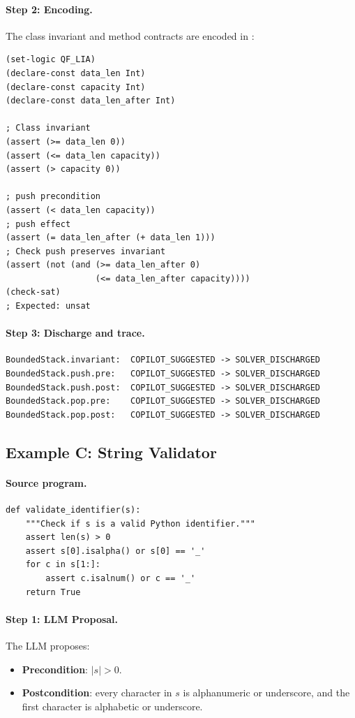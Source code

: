 \documentclass[11pt]{article}
\begin{document}
\paragraph{Step 2: Encoding.}
The class invariant and method contracts are encoded in \QFLIA:
\begin{lstlisting}[style=jugeo-output]
(set-logic QF_LIA)
(declare-const data_len Int)
(declare-const capacity Int)
(declare-const data_len_after Int)

; Class invariant
(assert (>= data_len 0))
(assert (<= data_len capacity))
(assert (> capacity 0))

; push precondition
(assert (< data_len capacity))
; push effect
(assert (= data_len_after (+ data_len 1)))
; Check push preserves invariant
(assert (not (and (>= data_len_after 0)
                  (<= data_len_after capacity))))
(check-sat)
; Expected: unsat
\end{lstlisting}

\paragraph{Step 3: Discharge and trace.}
\begin{lstlisting}[style=jugeo-output]
BoundedStack.invariant:  COPILOT_SUGGESTED -> SOLVER_DISCHARGED
BoundedStack.push.pre:   COPILOT_SUGGESTED -> SOLVER_DISCHARGED
BoundedStack.push.post:  COPILOT_SUGGESTED -> SOLVER_DISCHARGED
BoundedStack.pop.pre:    COPILOT_SUGGESTED -> SOLVER_DISCHARGED
BoundedStack.pop.post:   COPILOT_SUGGESTED -> SOLVER_DISCHARGED
\end{lstlisting}

\subsection{Example C: String Validator}

\paragraph{Source program.}
\begin{lstlisting}[style=jugeo-python]
def validate_identifier(s):
    """Check if s is a valid Python identifier."""
    assert len(s) > 0
    assert s[0].isalpha() or s[0] == '_'
    for c in s[1:]:
        assert c.isalnum() or c == '_'
    return True
\end{lstlisting}

\paragraph{Step 1: LLM Proposal.}
The LLM proposes:
\begin{itemize}[noitemsep]
  \item \textbf{Precondition}: $|s| > 0$.
  \item \textbf{Postcondition}: every character in $s$ is alphanumeric
        or underscore, and the first character is alphabetic or
        underscore.
\end{itemize}
\end{document}
